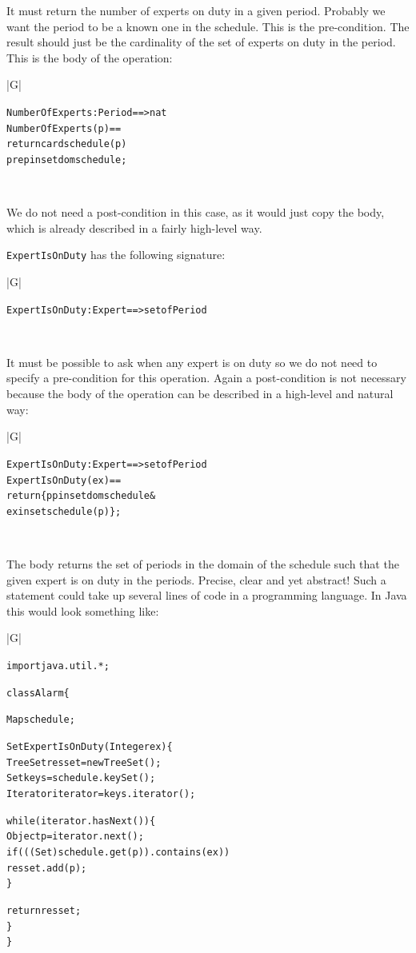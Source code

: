 \documentclass[\pformat,12pt,twoside]{article}
\newenvironment{VDMgray}%
{\begin{tabular}{|G|}\hline\small\begin{alltt}}%
{\end{alltt}\normalsize\\
 \hline\end{tabular}}
\begin{document}
It must return the number of experts on duty in a given period. 
Probably we want the period to be a known one in the schedule. 
This is the pre-condition. The result should just be the cardinality 
of the set of experts on duty in the period. This is the body 
of the operation:

\begin{VDMgray}
 NumberOfExperts : Period ==\texttt{>} nat
 NumberOfExperts(p) ==
   return card schedule(p)
 pre p in set dom schedule;
\end{VDMgray}


We do not need a post-condition in this case, as it would just 
copy the body, which is already described in a fairly high-level 
way.

\texttt{ExpertIsOnDuty} has the following signature:

\begin{VDMgray}
 ExpertIsOnDuty : Expert ==\texttt{>} set of Period
\end{VDMgray}

It must be possible to ask when any expert is on duty so we do 
not need to specify a pre-condition for this operation. Again 
a post-condition is not necessary because the body of the operation 
can be described in a high-level and natural way:

\begin{VDMgray}
 ExpertIsOnDuty : Expert ==\texttt{>} set of Period
 ExpertIsOnDuty(ex) ==
   return \{p {\textbar} p in set dom schedule \& 
              ex in set schedule(p)\};
\end{VDMgray}

The body returns the set of periods in the domain of the schedule 
such that the given expert is on duty in the periods. Precise, 
clear and yet abstract! Such a statement could take up several 
lines of code in a programming language. In Java this would look something 
like: 

\begin{VDMgray}
import java.util.*;

class Alarm \{

  Map schedule;

    Set ExpertIsOnDuty(Integer ex) \{
      TreeSet resset = new TreeSet();
      Set keys = schedule.keySet();
      Iterator iterator = keys.iterator();

      while(iterator.hasNext()) \{
        Object p = iterator.next();
        if ( ( (Set) schedule.get(p)).contains(ex))
            resset.add(p);
      \}

      return resset;
   \}
\}
\end{VDMgray}
\end{document}
